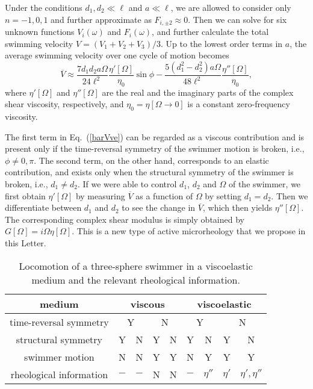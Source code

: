 \documentclass[nofootinbib,twocolumn,showpacs,preprintnumbers,pre,aps]{revtex4-1}
\begin{document}
Under the conditions $d_1, d_2 \ll \ell$ and $a \ll \ell$,  we are allowed to 
consider only $n=-1, 0, 1$ and further approximate as $F_{i,\pm2}\approx 0$.
Then we can solve for six unknown functions $V_i(\omega)$ and $F_i(\omega)$, 
and further calculate the total swimming velocity 
$V=(V_1+V_2+V_3)/3$. 
Up to the lowest order terms in $a$, the average swimming velocity over one 
cycle of motion becomes~\cite{supplement} 
\begin{equation}
\overline{V} \approx \frac{7d_1d_2a\Omega}{24\ell^2}\frac{\eta'[\Omega]}{\eta_0}
\sin\phi 
-\frac{5(d_1^2-d_2^2)a\Omega}{48\ell^2}\frac{\eta''[\Omega]}{\eta_0},
\label{barVve}
\end{equation}
where $\eta'[\Omega]$ and $\eta''[\Omega]$ are the real and the imaginary parts of the 
complex shear viscosity, respectively, and $\eta_0=\eta[\Omega \rightarrow 0]$ is a 
constant zero-frequency viscosity.


The first term in Eq.~(\ref{barVve}) can be regarded as a viscous contribution and is 
present only if the time-reversal symmetry of the swimmer motion is broken, i.e., $\phi \ne 0,\pi$.
The second term, on the other hand, corresponds to an elastic contribution, and exists only 
when the structural symmetry of the swimmer is broken, i.e., $d_1 \ne d_2$. 
If we were able to control $d_1$, $d_2$ and $\Omega$ of the swimmer,  we first obtain 
$\eta'[\Omega]$ by measuring $\overline{V}$ as a function of $\Omega$ by setting 
$d_1=d_2$. 
Then we differentiate between $d_1$ and $d_2$ to see the change in $\overline{V}$, 
which then yields $\eta''[\Omega]$.
The corresponding complex shear modulus is simply obtained by $G[\Omega]=i \Omega \eta[\Omega]$.
This is a new type of active microrheology that we propose in this Letter.


\begin{table}[t]
\label{table}
\begin{center}
\caption{Locomotion of a three-sphere swimmer in a viscoelastic medium and the relevant
rheological information.}
  \begin{tabular}{|c||c|c|c|c|c|c|c|c|} \hline
    medium & \multicolumn{4}{|c|}{viscous} & \multicolumn{4}{|c|}{viscoelastic}\\ \hline
    time-reversal symmetry &  \multicolumn{2}{|c|}{Y} & \multicolumn{2}{|c|}{N}& \multicolumn{2}{|c|}{Y} & \multicolumn{2}{|c|}{N}  \\ \hline
     structural symmetry &  Y & N &Y & N &Y & N &Y & N\\ \hline\hline
     swimmer motion &N&N&Y&Y&N&Y&Y&Y\\\hline
     rheological information &$-$&$-$&N&N&$-$&$\eta''$&$\eta'$&$\eta',\eta''$\\\hline
  \end{tabular}
  \label{gst}
  \end{center}
\end{table}
\end{document}
